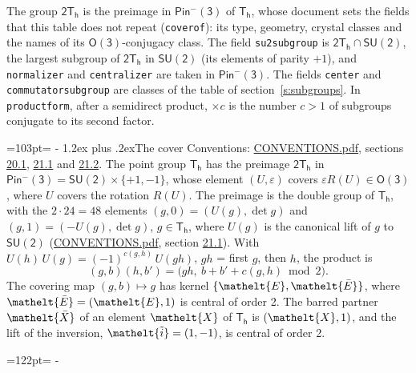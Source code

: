 \documentclass[10pt,a4paper]{article}
\makeatletter
\renewcommand\section{\@startsection{section}{1}{\z@}{-3ex plus -1ex minus -.2ex}%
  {1.2ex plus .2ex}{\normalfont\large\sffamily\bfseries\color{parttitle}}}
\newcommand{\needspace}[1]{\par\penalty-100\begingroup\dimen0=#1\relax\dimen2=\pagegoal
  \advance\dimen2-\pagetotal\ifdim\dimen0>\dimen2\relax\ifdim\dimen2>0pt\vfil\break\fi\fi
  \endgroup}
\numberwithin{equation}{section}
\newcommand{\eltfont}[1]{{\let\sigma\eltsigma\mathelt{#1}}}
\newcommand{\grp}[1]{\mathsf{#1}}
\newcommand{\elt}[1]{\eltfont{#1}}
\newcommand{\dirprod}{\times}
\newcommand{\barred}[1]{\bar{#1}}
\newcommand{\lift}[1]{\tilde{#1}}
\makeatother
\begin{document}
\leavevmode\label{n:element.inversion}\label{n:group.preimage}The group $\grp{2T_{h}}$ is the preimage in $\grp{Pin^{-}(3)}$ of \href{../../../rotation/data/pdf/Th.pdf}{$\grp{T_{h}}$}, whose document sets the fields that this table does not repeat (\texttt{coverof}): its type, geometry, crystal classes and the names of its \href{../../../rotation/data/pdf/O3.pdf}{$\grp{O(3)}$}-conjugacy class. The field \texttt{su2subgroup} is $\grp{2T_{h}} \cap \grp{SU(2)}$, the largest subgroup of $\grp{2T_{h}}$ in $\grp{SU(2)}$ (its elements of parity $+1$), and \texttt{normalizer} and \texttt{centralizer} are taken in $\grp{Pin^{-}(3)}$. The fields \texttt{center} and \texttt{commutatorsubgroup} are classes of the table of section~\ref{s:subgroups}.
\leavevmode\label{n:index.conjugates.c}In \texttt{productform}, after a semidirect product, ${\times}c$ is the number $c > 1$ of subgroups conjugate to its second factor.
\needspace{103pt}
\section{The cover}\label{s:cover}
Conventions: \href{../../CONVENTIONS.pdf}{CONVENTIONS.pdf}, sections \href{../../CONVENTIONS.pdf\#conv.20.1}{20.1}, \href{../../CONVENTIONS.pdf\#conv.21.1}{21.1} and \href{../../CONVENTIONS.pdf\#conv.21.2}{21.2}.
\leavevmode\label{n:group.pin.minus}\label{n:group.su2}\label{n:local.pin.sign}\label{n:matrix.covered}\label{n:matrix.lift.su2}\label{n:index.bar}The point group $\grp{T_{h}}$ has the preimage $\grp{2T_{h}}$ in $\grp{Pin^{-}(3)} = \grp{SU(2)} \dirprod \{+1, -1\}$, whose element $(U, \varepsilon)$ covers $\varepsilon R(U) \in \grp{O(3)}$, where $U$ covers the rotation $R(U)$. The preimage is the double group of $\grp{T_{h}}$, with the $2 \cdot 24 = 48$ elements $(g, 0) = (U(g), \det g)$ and $(g, 1) = (-U(g), \det g)$, $g \in \grp{T_{h}}$, where $U(g)$ is the canonical lift of $g$ to $\grp{SU(2)}$ (\href{../../CONVENTIONS.pdf}{CONVENTIONS.pdf}, section \href{../../CONVENTIONS.pdf\#conv.21.1}{21.1}). \label{n:function.cocycle}With $U(h)\,U(g) = (-1)^{c(g,h)}\,U(gh)$, $gh$ = first $g$, then $h$, the product is
\begin{equation}\label{e:product}(g, b)(h, b') = \bigl(gh,\ b + b' + c(g, h) \bmod 2\bigr).\end{equation}
\leavevmode\label{n:mark.bar}The covering map $(g, b) \mapsto g$ has kernel $\{\elt{E}, \elt{\barred{E}}\}$, where $\elt{\barred{E}} = (\elt{E}, 1)$ is central of order 2. \label{n:element.named}\label{n:mark.lift}The barred partner $\elt{\barred{X}}$ of an element $\elt{X}$ of $\grp{T_{h}}$ is $(\elt{X}, 1)$, and the lift of the inversion, $\elt{\lift{i}} = (1, -1)$, is central of order 2.
\needspace{122pt}
\end{document}
